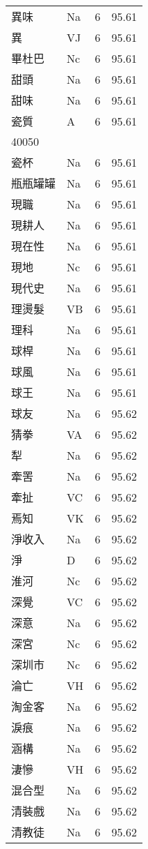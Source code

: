 \documentclass[twocolumn]{book}
\begin{document}
\begin{supertabular}{llrr}
異味 & Na & 6 &  95.61\\
異 & VJ & 6 &  95.61\\
畢杜巴 & Nc & 6 &  95.61\\
甜頭 & Na & 6 &  95.61\\
甜味 & Na & 6 &  95.61\\
瓷質 & A & 6 &  95.61\\
40050\\
瓷杯 & Na & 6 &  95.61\\
瓶瓶罐罐 & Na & 6 &  95.61\\
現職 & Na & 6 &  95.61\\
現耕人 & Na & 6 &  95.61\\
現在性 & Na & 6 &  95.61\\
現地 & Nc & 6 &  95.61\\
現代史 & Na & 6 &  95.61\\
理燙髮 & VB & 6 &  95.61\\
理科 & Na & 6 &  95.61\\
球桿 & Na & 6 &  95.61\\
球風 & Na & 6 &  95.61\\
球王 & Na & 6 &  95.61\\
球友 & Na & 6 &  95.62\\
猜拳 & VA & 6 &  95.62\\
犁 & Na & 6 &  95.62\\
牽罟 & Na & 6 &  95.62\\
牽扯 & VC & 6 &  95.62\\
焉知 & VK & 6 &  95.62\\
淨收入 & Na & 6 &  95.62\\
淨 & D & 6 &  95.62\\
淮河 & Nc & 6 &  95.62\\
深覺 & VC & 6 &  95.62\\
深意 & Na & 6 &  95.62\\
深宮 & Nc & 6 &  95.62\\
深圳市 & Nc & 6 &  95.62\\
淪亡 & VH & 6 &  95.62\\
淘金客 & Na & 6 &  95.62\\
淚痕 & Na & 6 &  95.62\\
涵構 & Na & 6 &  95.62\\
淒慘 & VH & 6 &  95.62\\
混合型 & Na & 6 &  95.62\\
清裝戲 & Na & 6 &  95.62\\
清教徒 & Na & 6 &  95.62\\

\end{supertabular}
\end{document}
